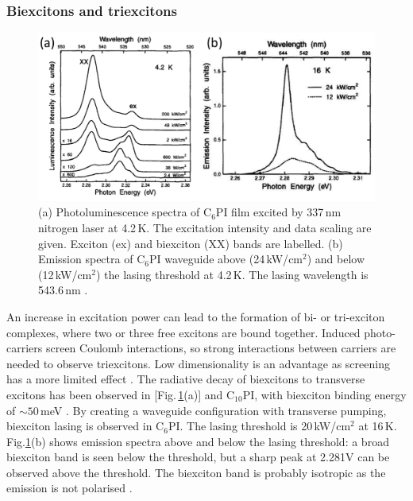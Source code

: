 \subsubsection{Biexcitons and triexcitons}
\begin{figure}[h!]
\centering
\includegraphics[width=\textwidth]{Fig15}
\caption{(a) Photoluminescence spectra of $\textrm{C}_{6}$PI film excited by 337\,nm nitrogen laser at 4.2\,K. The excitation intensity and data scaling are given. Exciton (ex) and biexciton (XX) bands are labelled. (b) Emission spectra of $\textrm{C}_{6}$PI waveguide above (24\,kW/$\textrm{cm}^2$) and below (12\,kW/$\textrm{cm}^2$) the lasing threshold at 4.2\,K. The lasing wavelength is 543.6\,nm \cite{Kondo1998}.}
\label{2Fig15}
\end{figure}
An increase in excitation power can lead to the formation of bi- or tri-exciton complexes, where two or three free excitons are bound together. Induced photo-carriers screen Coulomb interactions, so strong interactions between carriers are needed to observe triexcitons. Low dimensionality is an advantage as screening has a more limited effect \cite{Shimizu2006a}. The radiative decay of biexcitons to transverse excitons has been observed in  [Fig.\,\ref{2Fig15}(a)] and $\textrm{C}_{10}$PI, with biexciton binding energy of $\sim50$\,meV \cite{Kondo1998, Ishihara1992}. By creating a waveguide configuration with transverse pumping, biexciton lasing is observed in $\textrm{C}_6$PI. The lasing threshold is 20\,kW/$\textrm{cm}^2$ at 16\,K. Fig.\ref{2Fig15}(b) shows emission spectra above and below the lasing threshold: a broad biexciton band is seen below the threshold, but a sharp peak at 2.281V can be observed above the threshold. The biexciton band is probably isotropic as the emission is not polarised \cite{Kondo1998}.

